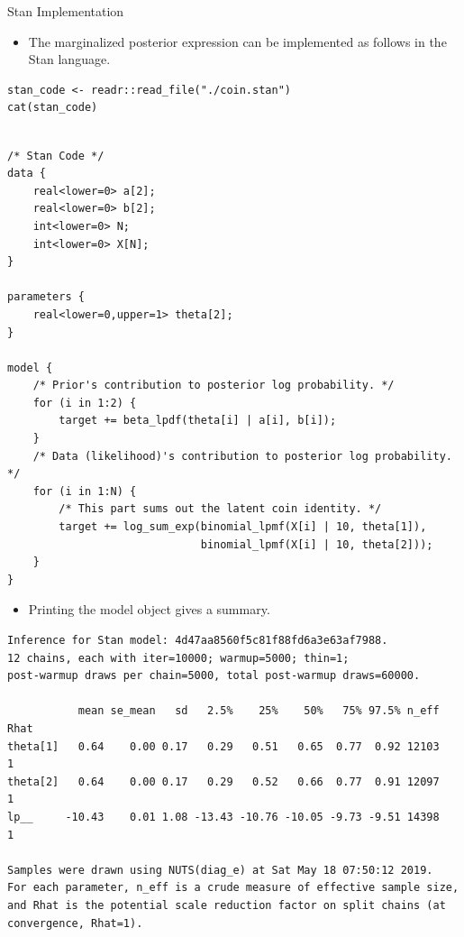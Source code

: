 \documentclass[dvipdfmx,bigger,aspectratio=169]{beamer}
\begin{document}
\begin{frame}[fragile,allowframebreaks,label=,t]{Stan Implementation}
 \begin{itemize}
\item The marginalized posterior expression can be implemented as follows in the Stan language.
\end{itemize}
\scriptsize
\begin{verbatim}
stan_code <- readr::read_file("./coin.stan")
cat(stan_code)
\end{verbatim}

\begin{verbatim}

/* Stan Code */
data {
    real<lower=0> a[2];
    real<lower=0> b[2];
    int<lower=0> N;
    int<lower=0> X[N];
}

parameters {
    real<lower=0,upper=1> theta[2];
}

model {
    /* Prior's contribution to posterior log probability. */
    for (i in 1:2) {
        target += beta_lpdf(theta[i] | a[i], b[i]);
    }
    /* Data (likelihood)'s contribution to posterior log probability. */
    for (i in 1:N) {
        /* This part sums out the latent coin identity. */
        target += log_sum_exp(binomial_lpmf(X[i] | 10, theta[1]),
                              binomial_lpmf(X[i] | 10, theta[2]));
    }
}
\end{verbatim}

\normalsize
\scriptsize
\normalsize
\newpage
\begin{itemize}
\item Printing the model object gives a summary.
\end{itemize}
\scriptsize
\begin{verbatim}
Inference for Stan model: 4d47aa8560f5c81f88fd6a3e63af7988.
12 chains, each with iter=10000; warmup=5000; thin=1; 
post-warmup draws per chain=5000, total post-warmup draws=60000.

           mean se_mean   sd   2.5%    25%    50%   75% 97.5% n_eff Rhat
theta[1]   0.64    0.00 0.17   0.29   0.51   0.65  0.77  0.92 12103    1
theta[2]   0.64    0.00 0.17   0.29   0.52   0.66  0.77  0.91 12097    1
lp__     -10.43    0.01 1.08 -13.43 -10.76 -10.05 -9.73 -9.51 14398    1

Samples were drawn using NUTS(diag_e) at Sat May 18 07:50:12 2019.
For each parameter, n_eff is a crude measure of effective sample size,
and Rhat is the potential scale reduction factor on split chains (at 
convergence, Rhat=1).
\end{verbatim}

\normalsize
\end{frame}
\end{document}
